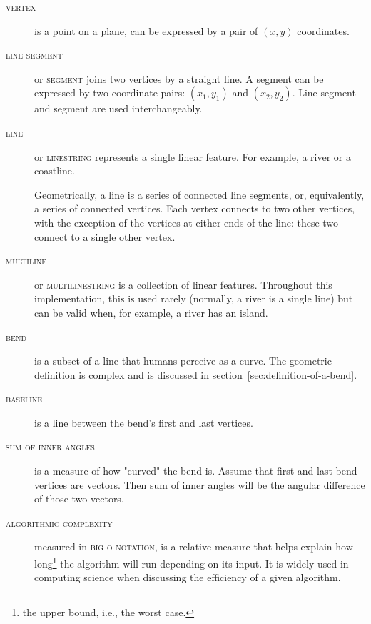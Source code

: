 \documentclass[a4paper]{article}
\begin{document}
\begin{description}

    \item[\normalfont\textsc{vertex}] is a point on a plane, can be expressed
        by a pair of $(x,y)$ coordinates.

    \item[\normalfont\textsc{line segment}] or \textsc{segment} joins two
        vertices by a straight line. A segment can be expressed by two
        coordinate pairs: $(x_1, y_1)$ and $(x_2, y_2)$. Line segment and
        segment are used interchangeably.

    \item[\normalfont\textsc{line}] or \textsc{linestring} represents a single
        linear feature. For example, a river or a coastline.

        Geometrically, a line is a series of connected line segments, or,
        equivalently, a series of connected vertices. Each vertex connects to
        two other vertices, with the exception of the vertices at either ends of the line:
        these two connect to a single other vertex.

    \item[\normalfont\textsc{multiline}] or \textsc{multilinestring} is a
        collection of linear features. Throughout this implementation, this is
        used rarely (normally, a river is a single line) but can be valid
        when, for example, a river has an island.

    \item[\normalfont\textsc{bend}] is a subset of a line that humans perceive
        as a curve. The geometric definition is complex and is discussed in
        section~\ref{sec:definition-of-a-bend}.

    \item[\normalfont\textsc{baseline}] is a line between the bend's first and last
        vertices.

    \item[\normalfont\textsc{sum of inner angles}] is a measure of how "curved"
        the bend is. Assume that first and last bend vertices are vectors. Then sum
        of inner angles will be the angular difference of those two vectors.

    \item[\normalfont\textsc{algorithmic complexity}] measured in \textsc{big o
        notation}, is a relative measure that helps explain how
        long\footnote{the upper bound, i.e., the worst case.} the
        algorithm will run depending on its input. It is widely used in computing
        science when discussing the efficiency of a given algorithm.


\end{description}
\end{document}

